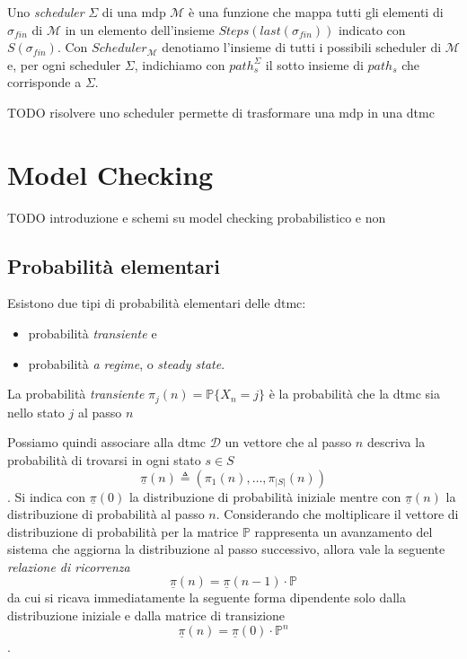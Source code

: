 \begin{mtdef}[Scheduler]
	Uno \emph{scheduler} $\Sigma$ di una \ac{mdp} $\mathcal{M}$ è una funzione che mappa tutti gli elementi di $\sigma_{fin}$ di $\mathcal{M}$ in un elemento dell'insieme $Steps(last(\sigma_{fin}))$ indicato con $S(\sigma_{fin})$. Con $Scheduler_{\mathcal{M}}$ denotiamo l'insieme di tutti i possibili scheduler di $\mathcal{M}$ e, per ogni scheduler $\Sigma$, indichiamo con $path_s^\Sigma$ il sotto insieme di $path_s$ che corrisponde a $\Sigma$.
\end{mtdef}

TODO risolvere uno scheduler permette di trasformare una mdp in una dtmc

\section{Model Checking}
TODO introduzione e schemi su model checking probabilistico e non
\subsection{Probabilità elementari}
Esistono due tipi di probabilità elementari delle \ac{dtmc}:
\begin{itemize}
	\item probabilità \emph{transiente} e
	\item probabilità \emph{a regime}, o \emph{steady state}.
\end{itemize}

\begin{mtdef}
La probabilità \emph{transiente} $\pi_j(n) = \mathbb{P}\{X_n = j\}$ è la probabilità che la \ac{dtmc} sia nello stato $j$ al passo $n$
\end{mtdef}

Possiamo quindi associare alla \ac{dtmc} $\mathcal{D}$ un vettore che al passo $n$ descriva la probabilità di trovarsi in ogni stato $s \in S$ $$\underline\pi(n) \triangleq (\pi_1(n), \dots, \pi_{|S|}(n))$$.
Si indica con $\underline\pi(0)$ la distribuzione di probabilità iniziale mentre con $\underline\pi(n)$ la distribuzione di probabilità al passo $n$.
Considerando che moltiplicare il vettore di distribuzione di probabilità per la matrice $\mathbb{P}$ rappresenta un avanzamento del sistema che aggiorna la distribuzione al passo successivo, allora vale la seguente \emph{relazione di ricorrenza}
$$ \underline\pi(n) = \underline\pi(n-1) \cdot \mathbb{P} $$
da cui si ricava immediatamente la seguente forma dipendente solo dalla  distribuzione iniziale e dalla matrice di transizione
$$ \underline\pi(n) = \underline\pi(0) \cdot \mathbb{P}^n$$.


